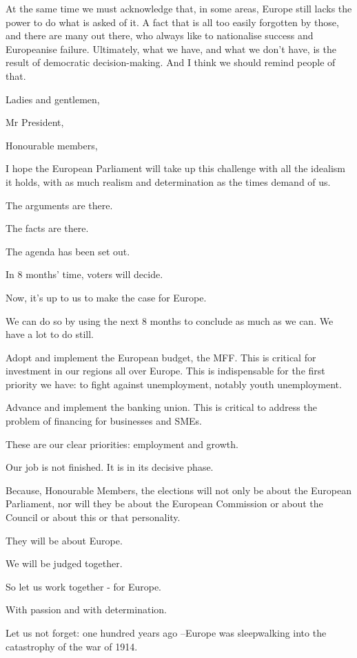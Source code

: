 \documentclass[a4paper,11pt]{article}
\begin{document}
At the same time we must acknowledge that, in some areas, Europe still lacks the power to do what is asked of it. A fact that is all too easily forgotten by those, and there are many out there, who always like to nationalise success and Europeanise failure. Ultimately, what we have, and what we don't have, is the result of democratic decision-making. And I think we should remind people of that.

Ladies and gentlemen,

Mr President,

Honourable members,

I hope the European Parliament will take up this challenge with all the idealism it holds, with as much realism and determination as the times demand of us.

The arguments are there.

The facts are there.

The agenda has been set out.

In 8 months' time, voters will decide.

Now, it's up to us to make the case for Europe.

We can do so by using the next 8 months to conclude as much as we can. We have a lot to do still.

Adopt and implement the European budget, the MFF. This is critical for investment in our regions all over Europe. This is indispensable for the first priority we have: to fight against unemployment, notably youth unemployment.

Advance and implement the banking union. This is critical to address the problem of financing for businesses and SMEs.

These are our clear priorities: employment and growth.

Our job is not finished. It is in its decisive phase.

Because, Honourable Members, the elections will not only be about the European Parliament, nor will they be about the European Commission or about the Council or about this or that personality.

They will be about Europe.

We will be judged together.

So let us work together - for Europe.

With passion and with determination.

Let us not forget: one hundred years ago –Europe was sleepwalking into the catastrophy of the war of 1914.
\end{document}
